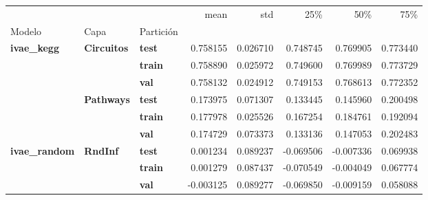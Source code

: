 \begin{tabular}{lllrrrrr}
\toprule
 &  &  & mean & std & 25\% & 50\% & 75\% \\
Modelo & Capa & Partición &  &  &  &  &  \\
\midrule
\multirow[t]{6}{*}{\textbf{ivae\_kegg}} & \multirow[t]{3}{*}{\textbf{Circuitos}} & \textbf{test} & 0.758155 & 0.026710 & 0.748745 & 0.769905 & 0.773440 \\
\textbf{} & \textbf{} & \textbf{train} & 0.758890 & 0.025972 & 0.749600 & 0.769989 & 0.773729 \\
\textbf{} & \textbf{} & \textbf{val} & 0.758132 & 0.024912 & 0.749153 & 0.768613 & 0.772352 \\
\cline{2-8}
\textbf{} & \multirow[t]{3}{*}{\textbf{Pathways}} & \textbf{test} & 0.173975 & 0.071307 & 0.133445 & 0.145960 & 0.200498 \\
\textbf{} & \textbf{} & \textbf{train} & 0.177978 & 0.025526 & 0.167254 & 0.184761 & 0.192094 \\
\textbf{} & \textbf{} & \textbf{val} & 0.174729 & 0.073373 & 0.133136 & 0.147053 & 0.202483 \\
\cline{1-8} \cline{2-8}
\multirow[t]{3}{*}{\textbf{ivae\_random}} & \multirow[t]{3}{*}{\textbf{RndInf}} & \textbf{test} & 0.001234 & 0.089237 & -0.069506 & -0.007336 & 0.069938 \\
\textbf{} & \textbf{} & \textbf{train} & 0.001279 & 0.087437 & -0.070549 & -0.004049 & 0.067774 \\
\textbf{} & \textbf{} & \textbf{val} & -0.003125 & 0.089277 & -0.069850 & -0.009159 & 0.058088 \\
\cline{1-8} \cline{2-8}
\bottomrule
\end{tabular}
